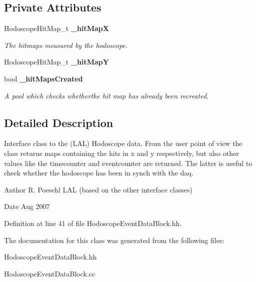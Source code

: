 \subsection*{Private Attributes}
\begin{DoxyCompactItemize}
\item 
HodoscopeHitMap\_\-t {\bf \_\-hitMapX}\label{classCALICE_1_1HodoscopeEventDataBlock_aca7b8496ec0403b0ac1dae0e137b6660}

\begin{DoxyCompactList}\small\item\em The hitmaps measured by the hodoscope. \item\end{DoxyCompactList}\item 
HodoscopeHitMap\_\-t {\bfseries \_\-hitMapY}\label{classCALICE_1_1HodoscopeEventDataBlock_a5e9c5d17dbc060cc176b3bf26c099a4d}

\item 
bool {\bf \_\-hitMapsCreated}\label{classCALICE_1_1HodoscopeEventDataBlock_a64ba1b45e7d59de63a972a762f976791}

\begin{DoxyCompactList}\small\item\em A pool which checks whetherthe hit map has already been recreated. \item\end{DoxyCompactList}\end{DoxyCompactItemize}


\subsection{Detailed Description}
Interface class to the (LAL) Hodoscope data. From the user point of view the class returns maps containing the hits in x and y respectively, but also other values like the timecounter and eventcounter are returned. The latter is useful to check whether the hodoscope has been in synch with the daq. \begin{DoxyAuthor}{Author}
R. Poeschl LAL (based on the other interface classes)
\end{DoxyAuthor}
\begin{DoxyDate}{Date}
Aug 2007 
\end{DoxyDate}


Definition at line 41 of file HodoscopeEventDataBlock.hh.

The documentation for this class was generated from the following files:\begin{DoxyCompactItemize}
\item 
HodoscopeEventDataBlock.hh\item 
HodoscopeEventDataBlock.cc\end{DoxyCompactItemize}
